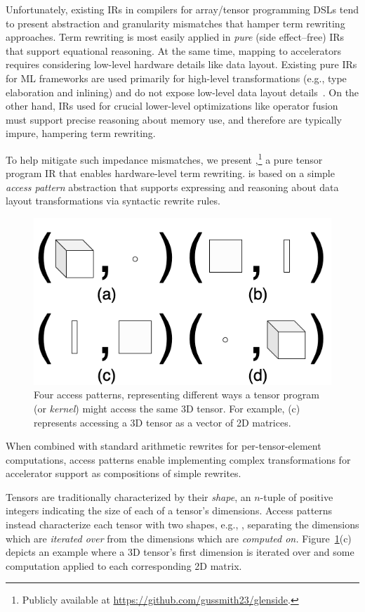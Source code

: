 Unfortunately, existing IRs in compilers for
  array/tensor programming DSLs tend to
  present abstraction and granularity mismatches
  that hamper term rewriting approaches.
Term rewriting is most easily applied in
  \textit{pure} (side effect--free) IRs
  that support equational reasoning.
At the same time,
  mapping to accelerators requires considering
  low-level hardware details like data layout.
Existing pure IRs for ML frameworks are used
  primarily for high-level transformations
  (e.g., type elaboration and inlining)
  and do not expose low-level data layout details~\cite{relay}.
On the other hand,
  IRs used for crucial lower-level optimizations like
  operator fusion must support
  precise reasoning about memory use,
  and therefore are typically impure,
  hampering term rewriting.%

To help mitigate such impedance mismatches,
  we present \textit{\g},\footnote{Publicly available at \url{https://github.com/gussmith23/glenside}.}
  a pure tensor program IR
  that enables hardware-level term rewriting.
\g is based on a simple
  \textit{access pattern} abstraction that
  supports expressing and reasoning about
  data layout transformations via
  syntactic rewrite rules.
  \begin{figure}
    \centering
    \includegraphics[width=.6\linewidth]{glenside/access-pattern-examples-2x2.png}
    \caption{
      Four access patterns,
        representing different ways
        a
        tensor program
        (or \textit{kernel})
        might access
        the same 3D tensor. 
      For example, (c) represents
        accessing a 3D tensor as
        a vector of 2D matrices.}
    \label{fig:access-pattern-examples}
    \vspace{-1em}
\end{figure}
When combined with standard arithmetic rewrites
  for per-tensor-element computations,
  access patterns enable implementing complex
  transformations for accelerator support as
  compositions of simple rewrites.

Tensors are traditionally characterized
  by their \textit{shape},
  an $n$-tuple 
  of positive integers
  indicating the size of each
  of a tensor's dimensions.
Access patterns instead characterize
  each tensor with two shapes, e.g.,
  , separating
  the dimensions which are \textit{iterated over} from
  the dimensions which are \textit{computed on.}
Figure~\ref{fig:access-pattern-examples}(c)
  depicts an example where a 3D tensor's
  first dimension is iterated over and
  some computation applied to each
  corresponding 2D matrix.

